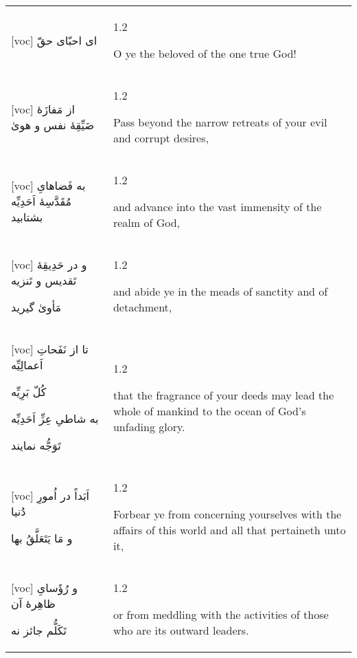 \documentclass[11pt]{article}
\makeatletter
\newenvironment{orig}
  {\begin{farsi}[voc]}
  {\end{farsi}}
\newenvironment{trans}
  {\Large\begin{spacing}{1.2}\raggedright}
  {\end{spacing}}
\newenvironment{word}
  {\begin{tabular}[t]{p{2.75in}@{\hspace{3em}}p{2.875in}}}
  {\end{tabular}}
\newcommand{\ayat}[2]{\begin{orig}#1\end{orig} & \begin{trans}#2\end{trans}}
\newcommand{\define}[3]{\textfarsi[voc]{\Huge
    \textbf{#1}}\hspace{3mm}{\headwordfont \large
    \textit{#2}}\hspace{3mm}{\Large #3} \\[3ex]}
\newcommand{\fulldefine}[3]{\textfarsi[voc]{\Huge
    \textbf{#1}}\hspace{3mm}{\headwordfont \large
    \textit{#2}}\vspace{-1ex}\begin{quote}\Large #3\end{quote}\vspace{1ex}}
\makeatother
\begin{document}
\begin{word}
\ayat{
ای احبّای حقّ
}{O ye the beloved of the one true God!} \vspace{-1ex}\\ \ayat{
از مَفازَۀ ضَیِّقِۀ نفس و هویٰ
}{Pass beyond the narrow retreats of your evil and corrupt desires,} \vspace{-1ex}\\ \ayat{
به فَضاهایِ مُقَدَّسِۀ اَحَدِیِّه بشتابید
}{and advance into the vast immensity of the realm of God,} \vspace{-1ex}\\ \ayat{
و در حَدِیقِۀ تَقدیس و تَنزیه

مَأویٰ گیرید
}{and abide ye in the meads of sanctity and of detachment,} \\ \ayat{
تا از نَفَحاتِ اَعمالِیِّه

کُلّ بَرِیِّه

به شاطیِ عِزِّ اَحَدِیِّه

تَوَجُّه نمایند
}{that the fragrance of your deeds may lead the whole of mankind to the ocean
  of God’s unfading glory.} \vspace{-1ex}\\ \ayat{
اَبَداً در اُمورِ دُنیا

و مَا یَتَعَلَّقُ بها
}{Forbear ye from concerning yourselves with the affairs of this world and all
  that pertaineth unto it,} \vspace{-1ex}\\ \ayat{
و رُؤَسایِ ظاهِرۀ آن

تَکَلُّم جائز نه
}{or from meddling with the activities of those who are its outward leaders.}
\end{word}



\newpage
\end{document}
